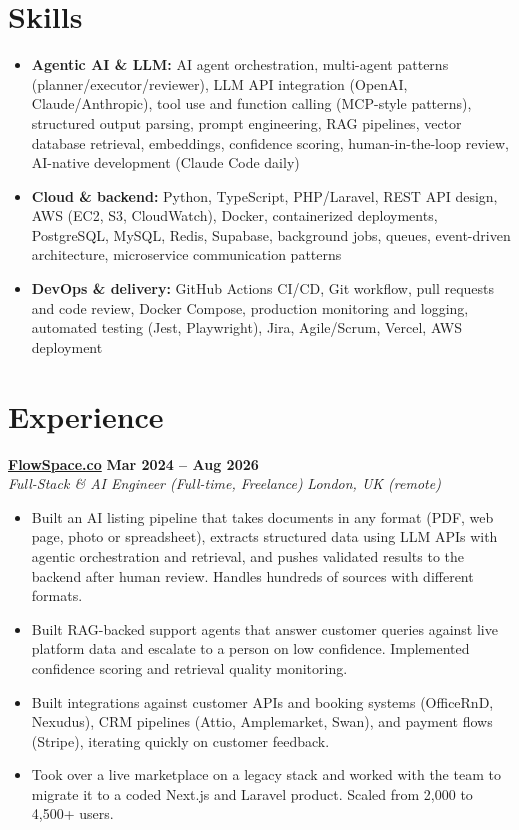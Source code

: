\documentclass[a4paper,10pt]{article}
\newcommand{\role}[4]{%
 \textbf{#1} \hfill \textbf{#2}\\[1pt]%
 \textit{#3} \hfill \textit{#4}\\[2pt]%
}
\begin{document}
\section{Skills}
\begin{itemize}
 \item \textbf{Agentic AI \& LLM:} AI agent orchestration, multi-agent patterns (planner/executor/reviewer), LLM API integration (OpenAI, Claude/Anthropic), tool use and function calling (MCP-style patterns), structured output parsing, prompt engineering, RAG pipelines, vector database retrieval, embeddings, confidence scoring, human-in-the-loop review, AI-native development (Claude Code daily)
 \item \textbf{Cloud \& backend:} Python, TypeScript, PHP/Laravel, REST API design, AWS (EC2, S3, CloudWatch), Docker, containerized deployments, PostgreSQL, MySQL, Redis, Supabase, background jobs, queues, event-driven architecture, microservice communication patterns
 \item \textbf{DevOps \& delivery:} GitHub Actions CI/CD, Git workflow, pull requests and code review, Docker Compose, production monitoring and logging, automated testing (Jest, Playwright), Jira, Agile/Scrum, Vercel, AWS deployment
\end{itemize}

\section{Experience}

\role{\href{https://flowspace.co}{FlowSpace.co}}{Mar 2024 -- Aug 2026}{Full-Stack \& AI Engineer (Full-time, Freelance)}{London, UK (remote)}
\begin{itemize}
 \item Built an AI listing pipeline that takes documents in any format (PDF, web page, photo or spreadsheet), extracts structured data using LLM APIs with agentic orchestration and retrieval, and pushes validated results to the backend after human review. Handles hundreds of sources with different formats.
 \item Built RAG-backed support agents that answer customer queries against live platform data and escalate to a person on low confidence. Implemented confidence scoring and retrieval quality monitoring.
 \item Built integrations against customer APIs and booking systems (OfficeRnD, Nexudus), CRM pipelines (Attio, Amplemarket, Swan), and payment flows (Stripe), iterating quickly on customer feedback.
 \item Took over a live marketplace on a legacy stack and worked with the team to migrate it to a coded Next.js and Laravel product. Scaled from 2,000 to 4,500+ users.
\end{itemize}
\end{document}
